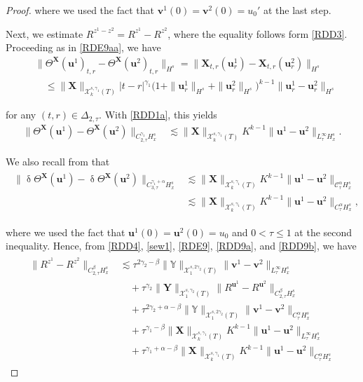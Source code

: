 \documentclass[letterpaper, 11pt,  reqno]{amsart}
\newcommand{\1}{\hspace{0.5mm}\textup{I}\hspace{0.5mm}}
\newcommand{\noi}{\noindent}
\newcommand{\CC}{\mathcal{C}}
\newcommand{\al}{\alpha}
\newcommand{\be}{\beta}
\newcommand{\updl}{\updelta}
\newcommand{\Dl}{\Delta}
\newcommand{\g}{\gamma}
\newcommand{\les}{\lesssim}
\newcommand{\cX}{\mathcal{X}}
\newcommand{\uu}{\mathbf{u}}
\newcommand{\vv}{\mathbf{v}}
\newcommand{\Ta}{\Theta}
\newcommand{\YYb}{\mathbb{Y}}
\newcommand{\XX}{\mathbf{X}}
\newcommand{\YY}{\mathbf{Y}}
\numberwithin{equation}{section}
\numberwithin{theorem}{section}
\begin{document}
\begin{proof}
\noi
where we used the fact that $\vv^1(0) = \vv^2(0) = u_0'$
at the last step.

Next, we estimate $R^{z^1 -z^2} = R^{z^1}  - R^{z^2}$, 
where the equality follows form \eqref{RDD3}.
Proceeding as in \eqref{RDE9aa}, 
we have
\begin{align*}
& \| \Ta^\XX(\uu^1)_{t, r}
- \Ta^\XX(\uu^2)_{t, r}
 \|_{H^s}
 = \| \XX_{t, r}(\uu^1_r)  - \XX_{t, r}(\uu^2_r) \|_{H^s}\\
& \quad \le \|\XX\|_{\cX^{s, \g_1}_k(T)}|t- r|^{\g_1}
\big( 1+ \|\uu^1_r\|_{H^s} + \|\uu^2_r\|_{H^s}\big)^{k-1} \|\uu^1_r - \uu^2_r\|_{H^s}
\end{align*}

\noi
for any $(t, r) \in \Dl_{2, \tau}$.
With \eqref{RDD1a}, this  yields
\begin{align}
\|\Ta^\XX(\uu^1) - \Ta^\XX(\uu^2) \|_{C^{\g_1}_{2, \tau}H^s_x}
& \les \|\XX\|_{\cX^{s, \g_1}_k(T)}
K^{k-1} \|\uu^1 - \uu^2\|_{L^\infty_\tau H^s_x}.
\label{RDD9a}
\end{align}




\noi
We also recall from \cite[(3.63)]{CGLLO1}
that 
\begin{align}
\begin{split}
\|\updl \Ta^\XX(\uu^1)
- \updl \Ta^\XX(\uu^2) \|_{C^{\g_1+\al}_{3, \tau}H^s_x}
& \les \|\XX\|_{\cX^{s, \g_1}_k(T)}
K^{k-1} \|\uu^1 - \uu^2\|_{\CC^\al _\tau H^s_x}\\
& \les \|\XX\|_{\cX^{s, \g_1}_k(T)}
K^{k-1} \|\uu^1 - \uu^2\|_{C^\al _\tau H^s_x}, 
\end{split}
\label{RDD9b}
\end{align}

\noi
where we used the fact that $\uu^1(0)  = \uu^2(0)  = u_0$ 
and $0 < \tau \le 1$
 at the second inequality.
Hence, from \eqref{RDD4}, 
\eqref{sew1},
\eqref{RDE9}, 
\eqref{RDD9a}, 
and \eqref{RDD9b}, 
we have
\begin{align}
\begin{split}
\| R^{z^1} - R^{z^2}\|_{C^\be_{2, \tau}H^s_x}
& \les \tau^{2\g_2 - \be} \|\YYb\|_{\cX^{s, 2\g_2}_1(T)}\|\vv^1 - \vv^2\|_{L^\infty_\tau H^s_x}\\
& \quad + \tau^{\g_2}
\|\YY\|_{\cX^{s, \g_2}_1(T)}
\| R^{\uu^1} - R^{\uu^2}\|_{C^\be_{2, \tau } H^s_x}\\
& \quad  +\tau^{2\g_2 + \al - \be}
\|\YYb\|_{\cX^{s, 2\g_2}_1(T)}\|\vv^1 - \vv^2\|_{C^\al_\tau H^s_x}\\
& \quad   + 
\tau^{\g_1 - \be}\|\XX\|_{\cX^{s, \g_1}_k(T)}
K^{k-1}
\|\uu^1 - \uu^2\|_{L^\infty_\tau H^s_x}\\
& \quad + 
 \tau^{\g_1 + \al - \be} \|\XX\|_{\cX^{s, \g_1}_k(T)}
K^{k-1}
 \|\uu^1 - \uu^2\|_{C^\al_\tau H^s_x}
\end{split}
\label{RDD10}
\end{align}


\end{proof}
\end{document}

